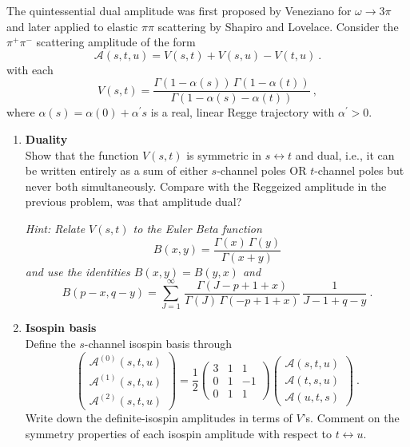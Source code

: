The quintessential dual amplitude was first proposed by Veneziano for $\omega\to3\pi$ and later applied to elastic $\pi\pi$ scattering by Shapiro and Lovelace. Consider the $\pi^+\pi^-$ scattering amplitude of the form
\begin{equation}
    \label{eq:Astu}
    \mathcal{A}(s,t,u) = V(s,t) + V(s,u) - V(t,u) ~.
\end{equation}
with each 
\begin{equation}   
    \label{eq:Fst}
    V(s,t) = \frac{\Gamma(1-\alpha(s)) \, \Gamma(1-\alpha(t))}{\Gamma(1-\alpha(s) - \alpha(t))} ~,
\end{equation}
where $\alpha(s) = \alpha(0) + \alpha^\prime s$ is a real, linear Regge trajectory with $\alpha^\prime > 0$. 

\begin{enumerate}
\item \textbf{Duality} \\
Show that the function $V(s,t)$ is symmetric in $s\leftrightarrow t$ and dual, i.e., it can be written entirely as a sum of either $s$-channel poles OR $t$-channel poles but never both simultaneously. Compare with the Reggeized amplitude in the previous problem, was that amplitude dual?

\noindent \textit{Hint: Relate $V(s,t)$ to the Euler Beta function
    \begin{equation}
        B(x,y) = \frac{\Gamma(x) \, \Gamma(y)}{\Gamma(x+y)}
    \end{equation}
and use the identities $B(x,y) = B(y,x)$ and
    \begin{equation}
        B(p-x, q-y) = \sum_{J=1}^\infty \, \frac{\Gamma(J-p+1 +x)}{\Gamma(J) \, \Gamma(-p + 1 +x)} \, \frac{1}{J-1+q-y} ~.
    \end{equation}
}

\item \textbf{Isospin basis} \\
Define the $s$-channel isospin basis through
    \begin{equation}
        \begin{pmatrix}
            \mathcal{A}^{(0)}(s,t,u) \\
            \mathcal{A}^{(1)}(s,t,u) \\
            \mathcal{A}^{(2)}(s,t,u)             
        \end{pmatrix}
        = 
        \frac{1}{2}\begin{pmatrix}
            3 & 1 & 1 \\
            0 & 1 & -1 \\
            0 & 1 & 1 
        \end{pmatrix}
        \begin{pmatrix}
            \mathcal{A}(s,t,u) \\
            \mathcal{A}(t,s,u) \\
            \mathcal{A}(u,t,s)              
        \end{pmatrix}
        ~.
    \end{equation}
Write down the definite-isospin amplitudes in terms of $V$'s. Comment on the symmetry properties of each isospin amplitude with respect to $t \leftrightarrow u$. 


\end{enumerate}
